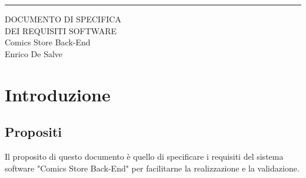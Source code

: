 \documentclass{scrreprt}
\date{}
\begin{document}
\begin{flushright}
    \rule{16cm}{5pt}\vskip1cm
    \begin{bfseries}
        \Huge{DOCUMENTO DI SPECIFICA\\ DEI REQUISITI SOFTWARE}\\
        \vspace{1.9cm}
        Comics Store Back-End\\
        \vspace{1.9cm}
        Enrico De Salve\\
        \vspace{1.9cm}
    \end{bfseries}
\end{flushright}

\tableofcontents

\chapter{Introduzione}

\section{Propositi}
Il proposito di questo documento è quello di specificare i requisiti del sistema software
"Comics Store Back-End" per facilitarne la realizzazione e la validazione.
\end{document}
